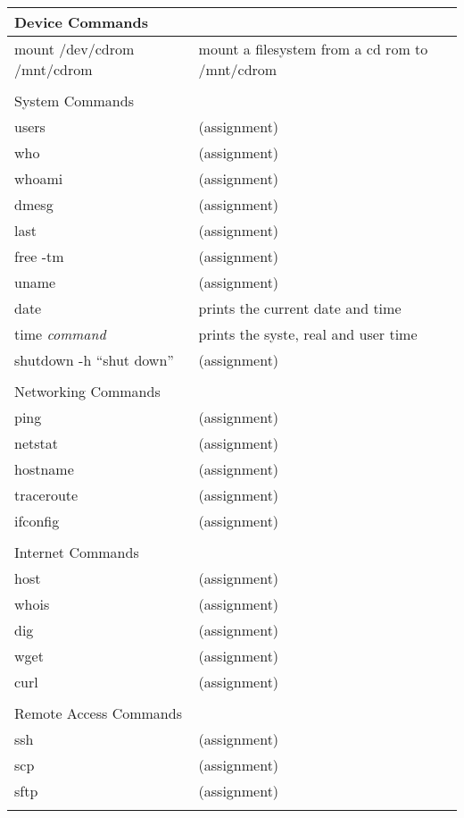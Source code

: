 \begin{center}
\begin{longtable}{|p{4cm}|p{8cm}|}
  \hline
  \multicolumn{2}{|l|}{\cellcolor{blue!15} Device Commands}\\
  \hline
  mount /dev/cdrom /mnt/cdrom & mount a filesystem from a cd rom to /mnt/cdrom\\
  & \\

  \hline
  \multicolumn{2}{|l|}{\cellcolor{blue!15} System Commands}\\
  \hline
  users &  (assignment) \\
  who &  (assignment) \\
  whoami &  (assignment) \\
  dmesg &  (assignment) \\
  last &  (assignment) \\
  free -tm &  (assignment) \\
  uname &  (assignment) \\
  date &  prints the current date and time \\
  time \textit{command} &  prints the syste, real and user time \\
  shutdown -h ``shut down'' & (assignment) \\
  & \\

  \hline
  \multicolumn{2}{|l|}{\cellcolor{blue!15} Networking Commands}\\
  \hline
  ping &  (assignment) \\
  netstat &  (assignment) \\
  hostname &  (assignment) \\
  traceroute &  (assignment) \\
  ifconfig &  (assignment) \\
  & \\

  \hline
  \multicolumn{2}{|l|}{\cellcolor{blue!15} Internet Commands}\\
  \hline
  host &  (assignment) \\
  whois &  (assignment) \\
  dig &  (assignment) \\
  wget &  (assignment) \\
  curl &  (assignment) \\
  & \\

  \hline
  \multicolumn{2}{|l|}{\cellcolor{blue!15} Remote Access Commands}\\
  \hline
  ssh &  (assignment) \\
  scp &  (assignment) \\
  sftp &  (assignment) \\
  & \\


\end{longtable}
\end{center}

